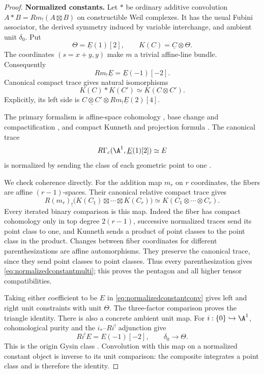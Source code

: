 \begin{proof}
\par\smallskip\noindent\textbf{Normalized constants.}\quad
Let $*$ be ordinary additive convolution
$A*B=Rm_!(A\boxtimes B)$ on constructible Weil complexes.
It has the usual Fubini associator, the derived symmetry
induced by variable interchange, and ambient unit $\delta_0$.
Put
\[
 \Theta=\underline E(1)[2],\qquad
 K(C)=\underline C\otimes\Theta.
\]
The coordinates $(s=x+y,y)$ make $m$ a trivial affine-line bundle.
Consequently
\[
 Rm_!\underline E=\underline E(-1)[-2].
\]
Canonical compact trace gives natural isomorphisms
\begin{equation}\label{eq:normalizedconstantconv}
 K(C)*K(C')\simeq K(C\otimes C').
\end{equation}
Explicitly, its left side is
$\underline{C\otimes C'}\otimes Rm_!\underline E(2)[4]$.

The primary formalism is affine-space cohomology
\cite[Example~16.3, p.~109]{Milne},
base change and compactification
\cite[Theorem~17.10, p.~116; Proposition~18.4,
pp.~121--122]{Milne}, and compact Kunneth and projection
formula \cite[Theorem~22.1, Remarks~22.3(b),(d),
Proposition~22.5, pp.~135--137]{Milne}.
The canonical trace
\[
 R\Gamma_c(\A^1,\underline E(1)[2])\simeq E
\]
is normalized by sending the class of each geometric point
to one \cite[Theorem~24.1(a),(b), p.~144]{Milne}.

We check coherence directly. For the addition map $m_r$
on $r$ coordinates, the fibers are affine $(r-1)$-spaces.
Their canonical relative compact trace gives
\begin{equation}\label{eq:normalizedconstantmulti}
 R(m_r)_!\bigl(K(C_1)\boxtimes\cdots\boxtimes K(C_r)\bigr)
 \simeq K(C_1\otimes\cdots\otimes C_r).
\end{equation}
Every iterated binary comparison is this map.
Indeed the fiber has compact cohomology only in top degree
$2(r-1)$, successive normalized traces send its point
class to one, and Kunneth sends a product of point classes
to the point class in the product.
Changes between fiber coordinates for different parenthesizations
are affine automorphisms. They preserve the canonical trace,
since they send point classes to point classes.
Thus every parenthesization gives
\eqref{eq:normalizedconstantmulti}; this proves the pentagon
and all higher tensor compatibilities.

Taking either coefficient to be $E$ in
\eqref{eq:normalizedconstantconv} gives left and right unit
constraints with unit $\Theta$. The three-factor comparison
proves the triangle identity.
There is also a concrete ambient unit map.
For $i:\{0\}\hookrightarrow\A^1$, cohomological purity and
the $i_*$--$Ri^!$ adjunction give
\[
 Ri^!E=E(-1)[-2],\qquad \delta_0\longrightarrow\Theta.
\]
This is the origin Gysin class
\cite[Theorem~16.1, p.~108; Theorem~16.7 and its
preceding adjunction, p.~111]{Milne}.
Convolution with this map on a normalized constant object
is inverse to its unit comparison: the composite integrates
a point class and is therefore the identity.


\end{proof}

